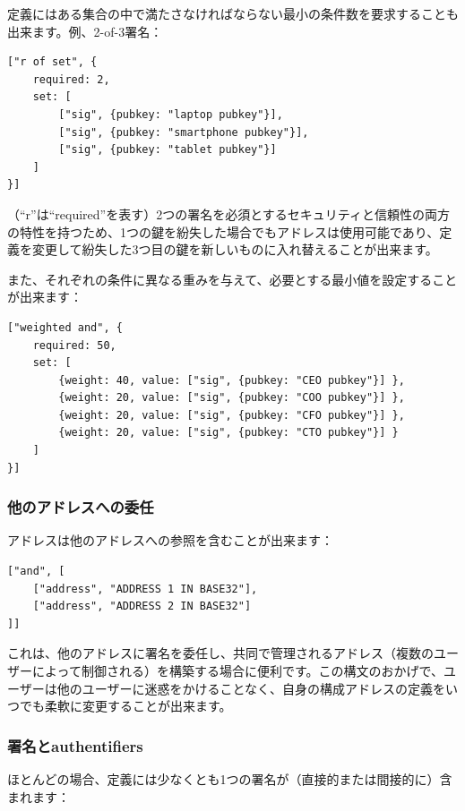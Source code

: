 \documentclass[a4paper, dvipdfmx]{jsarticle}
\begin{document}
定義にはある集合の中で満たさなければならない最小の条件数を要求することも出来ます。例、2-of-3署名：

\begin{lstlisting}[basicstyle=\ttfamily\footnotesize, frame=none]
["r of set", {
    required: 2,
    set: [
        ["sig", {pubkey: "laptop pubkey"}],
        ["sig", {pubkey: "smartphone pubkey"}],
        ["sig", {pubkey: "tablet pubkey"}]
    ]
}]
\end{lstlisting}

\noindent （“r”は“required”を表す）2つの署名を必須とするセキュリティと信頼性の両方の特性を持つため、1つの鍵を紛失した場合でもアドレスは使用可能であり、定義を変更して紛失した3つ目の鍵を新しいものに入れ替えることが出来ます。

また、それぞれの条件に異なる重みを与えて、必要とする最小値を設定することが出来ます：

\begin{lstlisting}[basicstyle=\ttfamily\footnotesize, frame=none]
["weighted and", {
    required: 50,
    set: [
        {weight: 40, value: ["sig", {pubkey: "CEO pubkey"}] },
        {weight: 20, value: ["sig", {pubkey: "COO pubkey"}] },
        {weight: 20, value: ["sig", {pubkey: "CFO pubkey"}] },
        {weight: 20, value: ["sig", {pubkey: "CTO pubkey"}] }
    ]
}]
\end{lstlisting}

\subsubsection{他のアドレスへの委任}
アドレスは他のアドレスへの参照を含むことが出来ます：

\begin{lstlisting}[basicstyle=\ttfamily\footnotesize, frame=none]
["and", [
    ["address", "ADDRESS 1 IN BASE32"],
    ["address", "ADDRESS 2 IN BASE32"]
]]
\end{lstlisting}

\noindent これは、他のアドレスに署名を委任し、共同で管理されるアドレス（複数のユーザーによって制御される）を構築する場合に便利です。この構文のおかげで、ユーザーは他のユーザーに迷惑をかけることなく、自身の構成アドレスの定義をいつでも柔軟に変更することが出来ます。


\subsubsection{署名とauthentifiers}
ほとんどの場合、定義には少なくとも1つの署名が（直接的または間接的に）含まれます：
\end{document}
